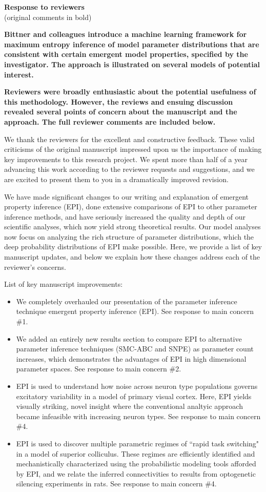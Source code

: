 \documentclass[11pt,a4paper]{article}
\begin{document}
 

{\Large \textbf{Response to reviewers}} \\
(original comments in bold)

\textbf{Bittner and colleagues introduce a machine learning framework for maximum entropy inference of model parameter distributions that are consistent with certain emergent model properties, specified by the investigator. The approach is illustrated on several models of potential interest.} 

\textbf{Reviewers were broadly enthusiastic about the potential usefulness of this methodology. However, the reviews and ensuing discussion revealed several points of concern about the manuscript and the approach. The full reviewer comments are included below.} 

We thank the reviewers for the excellent and constructive feedback.  These valid criticisms of the original manuscript impressed upon us the importance of making key improvements to this research project.  We spent more than half of a year advancing this work according to the reviewer requests and suggestions, and we are excited to present them to you in a dramatically improved revision.

We have made significant changes to our writing and explanation of emergent property inference (EPI), done extensive comparisons of EPI to other parameter inference methods, and have seriously increased the quality and depth of our scientific analyses, which now yield strong theoretical results.  Our model analyses now focus on analyzing the rich structure of parameter distributions, which the deep probability distributions of EPI make possible.  Here, we provide a list of key manuscript updates, and below we explain how these changes address each of the reviewer’s concerns.

List of key manuscript improvements:
\begin{itemize}
\item We completely overhauled our presentation of the parameter inference technique emergent property inference (EPI). See response to main concern \#1.
\item We added an entirely new results section to compare EPI to alternative parameter inference techniques (SMC-ABC and SNPE) as parameter count increases, which demonstrates the advantages of EPI in high dimensional parameter spaces. See response to main concern \#2.
\item EPI is used to understand how noise across neuron type populations governs excitatory variability in a model of primary visual cortex.  
Here, EPI yields visually striking, novel insight where the conventional analtyic approach became infeasible with increasing neuron types.  See response to main concern \#4.
\item EPI is used to discover multiple parametric regimes of ``rapid task switching" in a model of superior colliculus.  
These regimes are efficiently identified and mechanistically characterized using the probabilistic modeling tools afforded by EPI, and we relate the inferred connectivities to results from optogenetic silencing experiments in rats. See response to main concern \#4.
\end{itemize}
\end{document}
